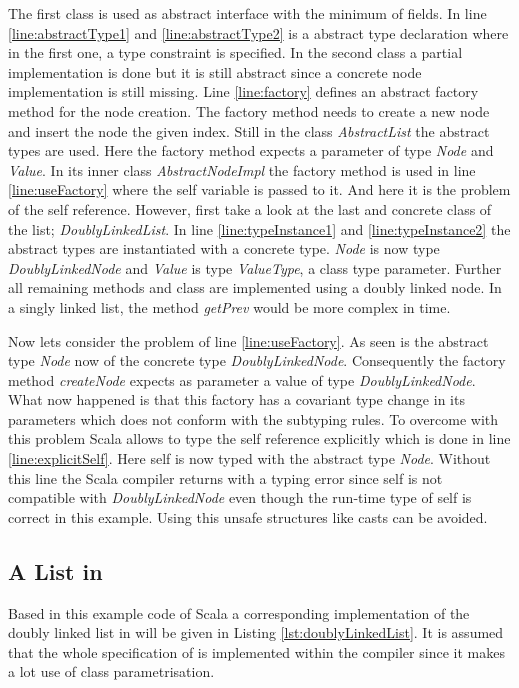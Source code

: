 The first class is used as abstract interface with the minimum of fields.
In line \ref{line:abstractType1} and \ref{line:abstractType2} is a
abstract type declaration where in the first one, a type constraint is
specified.  In the second class a partial implementation is done but it is
still abstract since a concrete node implementation is still missing. Line
\ref{line:factory} defines an abstract factory method for the node
creation. The factory method needs to create a new node and insert the
node the given index. Still in the class \emph{AbstractList} the abstract
types are used. Here the factory method expects a parameter of type
\emph{Node} and \emph{Value}. In its inner class \emph{AbstractNodeImpl}
the factory method is used in line \ref{line:useFactory} where the
self variable is passed to it. And here it is the problem of the self
reference. However, first take a look at the last and concrete class
of the list; \emph{DoublyLinkedList}. In line \ref{line:typeInstance1}
and \ref{line:typeInstance2} the abstract types are instantiated with
a concrete type. \emph{Node} is now type \emph{DoublyLinkedNode} and
\emph{Value} is type \emph{ValueType}, a class type parameter. Further all
remaining methods and class are implemented using a doubly linked node.
In a singly linked list, the method \emph{getPrev} would be more complex
in time.

Now lets consider the problem of line \ref{line:useFactory}. As
seen is the abstract type \emph{Node} now of the concrete
type \emph{DoublyLinkedNode}.  Consequently the factory
method \emph{createNode} expects as parameter a value of type
\emph{DoublyLinkedNode}. What now happened is that this factory has a
covariant type change in its parameters which does not conform with the
subtyping rules. To overcome with this problem Scala allows to type the
self reference explicitly which is done in line \ref{line:explicitSelf}.
Here self is now typed with the abstract type \emph{Node}. Without this
line the Scala compiler returns with a typing error since self is not
compatible with \emph{DoublyLinkedNode} even though the run-time
type of self is correct in this example. Using this unsafe structures
like casts can be avoided.



\subsection{A List in \ooplss}
Based in this example code of Scala a corresponding implementation
of the doubly linked list in \ooplss will be given in Listing
\ref{lst:doublyLinkedList}. It is assumed that the whole specification
of \ooplss is implemented within the compiler since it makes a lot use
of class parametrisation.

